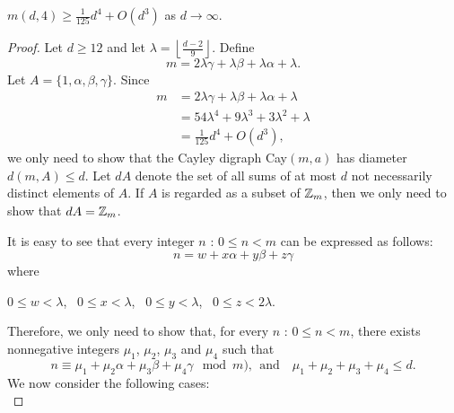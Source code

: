 \begin{theorem}
$\displaystyle m(d,4) \geq \frac{1}{125}d^4 + O(d^3)$  as $ d \to \infty$.
\end{theorem}

\begin{proof}
Let $d \geq 12$ and let $\lambda = \left \lfloor \frac{d - 2}{9} \right \rfloor$. Define
\[
m = 2\lambda \gamma + \lambda \beta + \lambda \alpha + \lambda.
\]
Let $A = \{1, \alpha, \beta, \gamma\}$. Since
\begin{align*}
m &= 2\lambda \gamma + \lambda \beta + \lambda \alpha + \lambda\\
 &= 54 \lambda^4 + 9 \lambda^3 + 3 \lambda^2 + \lambda\\
 &= \frac{1}{125} d^4 + O(d^3),
\end{align*}
we only need to show that the Cayley digraph Cay$(m, a)$ has diameter $d(m, A) \leq d$. Let $dA$ denote the set of all sums of at most $d$ not necessarily distinct elements of $A$. If $A$ is regarded as a subset of $\mbox{$\mathbb Z$}_m$, then we only need to show that $dA = \mbox{$\mathbb Z$}_m$. 

It is easy to see that every integer $n$ : $0 \leq n < m$ can be expressed as follows:
\[
n =  w + x\alpha + y\beta + z\gamma
\]
where 
\begin{center}
$0 \leq w < \lambda$, \ $0 \leq x < \lambda$, \ $0 \leq y < \lambda$, \ $0 \leq z < 2\lambda$.
\end{center}
Therefore, we only need to show that, for every $n$ : $0 \leq n < m$, there exists nonnegative integers $\mu_1$, $\mu_2$, $\mu_3$ and $\mu_4$ such that 
\[
n \equiv \mu_1 + \mu_2 \alpha + \mu_3 \beta  + \mu_4 \gamma \mod m ), \ \ \text{and }\ \ \   \mu_1 + \mu_2 + \mu_3 + \mu_4 \leq d.
\]
We now consider the following cases:\\



\end{proof}

